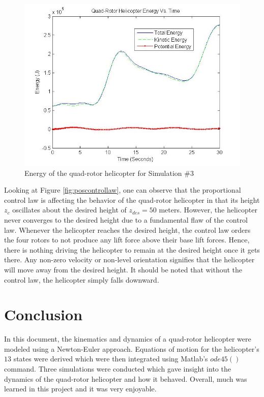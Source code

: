 \documentclass[journal]{IEEEtran}
\begin{document}
\begin{figure}[ht!!!!]
    \centering
        \includegraphics[width=.30\textwidth]{energycontrollaw}
    \caption{Energy of the quad-rotor helicopter for Simulation $\#3$}
    \label{fig:energycontrollaw}
\end{figure}

\pagebreak
Looking at Figure \ref{fig:poscontrollaw}, one can observe that the proportional control law is affecting the behavior of the quad-rotor helicopter in that its height $z_c$ oscillates about the desired height of $z_{des}=50$ meters. However, the helicopter never converges to the desired height due to a fundamental flaw of the control law. Whenever the helicopter reaches the desired height, the control law orders the four rotors to not produce any lift force above their base lift forces. Hence, there is nothing driving the helicopter to remain at the desired height once it gets there. Any non-zero velocity or non-level orientation signifies that the helicopter will move away from the desired height. It should be noted that without the control law, the helicopter simply falls downward. 

\section{Conclusion}
In this document, the kinematics and dynamics of a quad-rotor helicopter were modeled using a Newton-Euler approach. Equations of motion for the helicopter's $13$ states were derived which were then integrated using Matlab's $ode45()$ command. Three simulations were conducted which gave insight into the dynamics of the quad-rotor helicopter and how it behaved. Overall, much was learned in this project and it was very enjoyable. 


\end{document}
